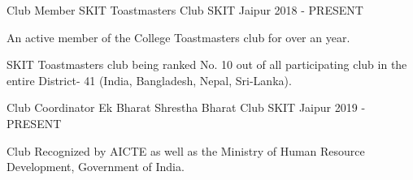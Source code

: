 


\begin{cventries}



  
 \cventry
    {Club Member} %
    {SKIT Toastmasters Club} %
    {SKIT Jaipur} %
    {2018 - PRESENT} %
    {
      \begin{cvitems} %
        \item {An active member of the College Toastmasters club for over an year.}
        \item {SKIT Toastmasters club being ranked No. 10 out of all participating club in the entire District- 41 (India, Bangladesh, Nepal, Sri-Lanka).}
      \end{cvitems}
    }
    
\cventry
    {Club Coordinator} %
    {Ek Bharat Shrestha Bharat Club} %
    {SKIT Jaipur} %
    {2019 - PRESENT} %
    {
      \begin{cvitems} %
        \item {Club Recognized by AICTE as well as the Ministry of Human Resource Development, Government of India.}
      \end{cvitems}
    }

\end{cventries}